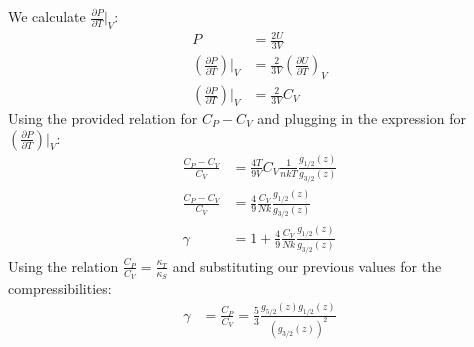 \documentclass[a4paper,11pt]{article}
\numberwithin{equation}{section}
\begin{document}
We calculate $\frac{\partial P}{\partial T}|_V$:
\begin{align}
 P &= \frac{2U}{3V}\\
 \left(\frac{\partial P}{\partial T}\right)|_V &= \frac{2}{3V}\left(\frac{\partial U}{\partial T}\right)_V\\
 \left(\frac{\partial P}{\partial T}\right)|_V &= \frac{2}{3V}C_V
\end{align}
Using the provided relation for $C_P-C_V$ and plugging in the expression for $\left(\frac{\partial P}{\partial T}\right)|_V$:
\begin{align}
 \frac{C_P-C_V}{C_V} &= \frac{4T}{9V}C_V\frac{1}{nkT}\frac{g_{1/2}(z)}{g_{3/2}(z)}\\
 \frac{C_P-C_V}{C_V} &= \frac{4}{9}\frac{C_V}{Nk}\frac{g_{1/2}(z)}{g_{3/2}(z)}\\
 \gamma &= 1 + \frac{4}{9}\frac{C_V}{Nk}\frac{g_{1/2}(z)}{g_{3/2}(z)}
\end{align}
Using the relation $\frac{C_P}{C_V}=\frac{\kappa_T}{\kappa_S}$ and substituting our previous values for the compressibilities:
\begin{align}
 \gamma &= \frac{C_P}{C_V} = \frac{5}{3}\frac{g_{5/2}(z)g_{1/2}(z)}{\left(g_{3/2}(z) \right)^2}
\end{align}
\end{document}
